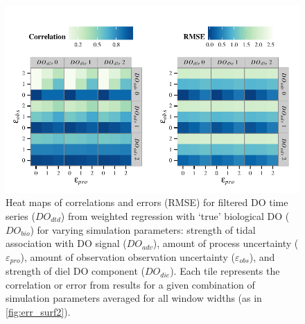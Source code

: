 \documentclass[letterpaper,12pt,oneside]{article}\usepackage[]{graphicx}\usepackage[]{color}
\makeatletter
\def\maxwidth{ %
  \ifdim\Gin@nat@width>\linewidth
    \linewidth
  \else
    \Gin@nat@width
  \fi
}
\newenvironment{knitrout}{}{} %
\makeatother
\begin{document}
\centering\vspace*{\fill}
\begin{knitrout}
\color{fgcolor}\begin{figure}[!ht]


{\centering \includegraphics[width=\maxwidth]{figure/err_surf1} 

}

\caption[Heat maps of correlations and errors (\ac{RMSE}) for filtered \ac{DO} time series ($DO_{dtd}$) from weighted regression with `true' biological \ac{DO} ($DO_{bio}$) for varying simulation parameters]{Heat maps of correlations and errors (\ac{RMSE}) for filtered \ac{DO} time series ($DO_{dtd}$) from weighted regression with `true' biological \ac{DO} ($DO_{bio}$) for varying simulation parameters: strength of tidal association with \ac{DO} signal ($DO_{adv}$), amount of process uncertainty ($\varepsilon_{pro}$), amount of observation observation uncertainty ($\varepsilon_{obs}$), and strength of diel \ac{DO} component ($DO_{die}$).  Each tile represents the correlation or error from results for a given combination of simulation parameters averaged for all window widths (as in \cref{fig:err_surf2}).\label{fig:err_surf1}}
\end{figure}


\end{knitrout}
\vfill
\clearpage
\end{document}
